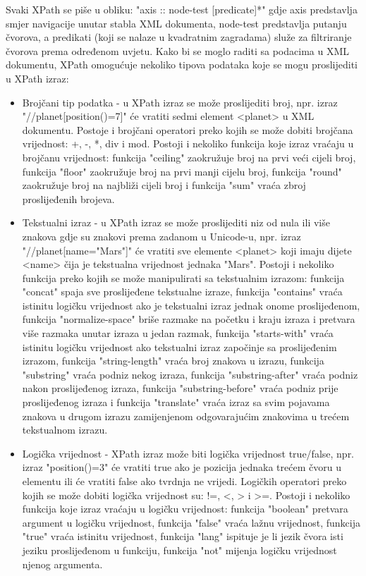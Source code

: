 \documentclass{foi}
\begin{document}
Svaki XPath se piše u obliku: "axis :: node-test [predicate]*" gdje axis predstavlja smjer navigacije unutar stabla XML dokumenta, node-test predstavlja putanju čvorova, a predikati (koji se nalaze u kvadratnim zagradama) služe za filtriranje čvorova prema određenom uvjetu. Kako bi se moglo raditi sa podacima u XML dokumentu, XPath omogućuje nekoliko tipova podataka koje se mogu proslijediti u XPath izraz:
\begin{itemize}
\item Brojčani tip podatka - u XPath izraz se može proslijediti broj, npr. izraz "//planet[position()=7]" će vratiti sedmi element <planet> u XML dokumentu. Postoje i brojčani operatori preko kojih se može dobiti brojčana vrijednost: +, -, *, div i mod. Postoji i nekoliko funkcija koje izraz vraćaju u brojčanu vrijednost: funkcija "ceiling" zaokružuje broj na prvi veći cijeli broj, funkcija "floor" zaokružuje broj na prvi manji cijelu broj, funkcija "round" zaokružuje broj na najbliži cijeli broj i funkcija "sum" vraća zbroj proslijeđenih brojeva.
\item Tekstualni izraz - u XPath izraz se može proslijediti niz od nula ili više znakova gdje su znakovi prema zadanom u Unicode-u, npr. izraz "//planet[name="Mars"]" će vratiti sve elemente <planet> koji imaju dijete <name> čija je tekstualna vrijednost jednaka "Mars". Postoji i nekoliko funkcija preko kojih se može manipulirati sa tekstualnim izrazom: funkcija "concat" spaja sve proslijeđene tekstualne izraze, funkcija "contains" vraća istinitu logičku vrijednost ako je tekstualni izraz jednak onome proslijeđenom, funkcija "normalize-space" briše razmake na početku i kraju izraza i pretvara više razmaka unutar izraza u jedan razmak, funkcija "starts-with" vraća istinitu logičku vrijednost ako tekstualni izraz započinje sa proslijeđenim izrazom, funkcija "string-length" vraća broj znakova u izrazu, funkcija "substring" vraća podniz nekog izraza, funkcija "substring-after" vraća podniz nakon proslijeđenog izraza, funkcija "substring-before" vraća podniz prije proslijeđenog izraza i funkcija "translate" vraća izraz sa svim pojavama znakova u drugom izrazu zamijenjenom odgovarajućim znakovima u trećem tekstualnom izrazu.
\item Logička vrijednost - XPath izraz može biti logička vrijednost true/false, npr. izraz "position()=3" će vratiti true ako je pozicija jednaka trećem čvoru u elementu ili će vratiti false ako tvrdnja ne vrijedi.  Logičkih operatori preko kojih se može dobiti logička vrijednost su: !=, <, > i >=. Postoji i nekoliko funkcija koje izraz vraćaju u logičku vrijednost: funkcija "boolean" pretvara argument u logičku vrijednost, funkcija "false" vraća lažnu vrijednost, funkcija "true" vraća istinitu vrijednost, funkcija "lang" ispituje je li jezik čvora isti jeziku proslijeđenom u funkciju, funkcija "not" mijenja logičku vrijednost njenog argumenta.

\end{itemize}
\end{document}
